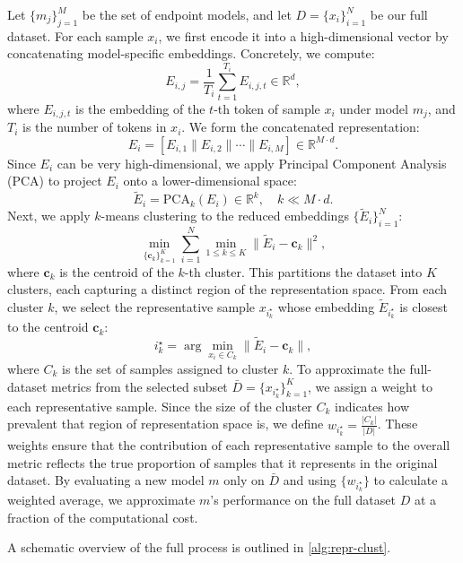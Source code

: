 Let \(\{m_j\}_{j=1}^M\) be the set of endpoint models, and let \(D = \{x_i\}_{i=1}^N\) be our full dataset. For each sample \(x_i\), we first encode it into a high-dimensional vector by concatenating model-specific embeddings. Concretely, we compute:
\[
    E_{i,j} = \frac{1}{T_i}\sum_{t=1}^{T_i} E_{i,j,t} \in \mathbb{R}^d,
\]
where \(E_{i,j,t}\) is the embedding of the \(t\)-th token of sample \(x_i\) under model \(m_j\), and \(T_i\) is the number of tokens in \(x_i\). We form the concatenated representation:
\[
    E_i = [E_{i,1}\|E_{i,2}\|\cdots\|E_{i,M}] \in \mathbb{R}^{M\cdot d}.
\]
%
Since \(E_i\) can be very high-dimensional, we apply Principal Component Analysis (PCA) to project \(E_i\) onto a lower-dimensional space:
\[
    \tilde{E}_i = \text{PCA}_k(E_i) \in \mathbb{R}^k, \quad k \ll M\cdot d.
\]
%
Next, we apply \(k\)-means clustering to the reduced embeddings \(\{\tilde{E}_i\}_{i=1}^N\):
\[
    \min_{\{\mathbf{c}_k\}_{k=1}^K}\sum_{i=1}^N \min_{1\leq k \leq K} \|\tilde{E}_i - \mathbf{c}_k\|^2,
\]
where \(\mathbf{c}_k\) is the centroid of the \(k\)-th cluster. This partitions the dataset into \(K\) clusters, each capturing a distinct region of the representation space.
From each cluster \(k\), we select the representative sample \(x_{i_k^\star}\) whose embedding \(\tilde{E}_{i_k^\star}\) is closest to the centroid \(\mathbf{c}_k\):
\[
    i_k^\star = \arg\min_{x_i \in C_k} \|\tilde{E}_i - \mathbf{c}_k\|,
\]
where \(C_k\) is the set of samples assigned to cluster \(k\).
To approximate the full-dataset metrics from the selected subset \(\bar{D}=\{x_{i_k^\star}\}_{k=1}^K\), we assign a weight to each representative sample. Since the size of the cluster \(C_k\) indicates how prevalent that region of representation space is, we define $w_{i_k^\star} = \frac{|C_k|}{|D|}$.
These weights ensure that the contribution of each representative sample to the overall metric reflects the true proportion of samples that it represents in the original dataset. By evaluating a new model \(m\) only on \(\bar{D}\) and using \(\{w_{i_k^\star}\}\) to calculate a weighted average, we approximate \(m\)’s performance on the full dataset \(D\) at a fraction of the computational cost.

A schematic overview of the full process is outlined in \cref{alg:repr-clust}. 


